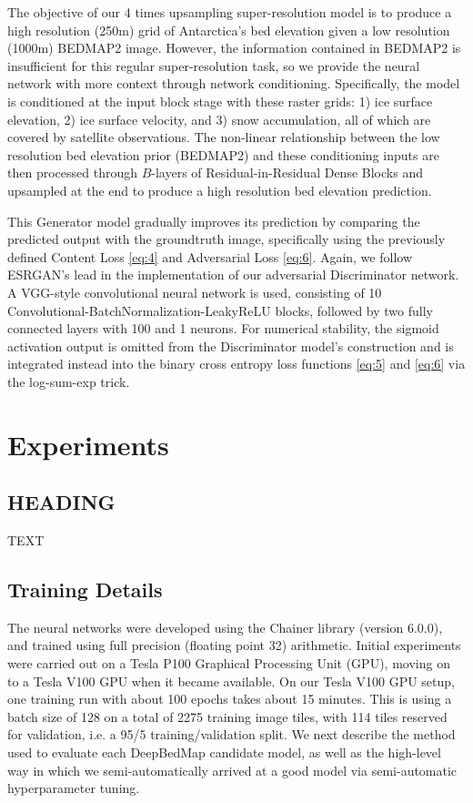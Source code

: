 \documentclass[tc, manuscript]{copernicus}
\begin{document}
The objective of our 4 times upsampling super-resolution model is to produce a high resolution (250m) grid of Antarctica's bed elevation given a low resolution (1000m) BEDMAP2 \citep{FretwellBedmap2improvedice2013} image.
However, the information contained in BEDMAP2 is insufficient for this regular super-resolution task, so we provide the neural network with more context through network conditioning.
Specifically, the model is conditioned at the input block stage with these raster grids: 1) ice surface elevation, 2) ice surface velocity, and 3) snow accumulation, all of which are covered by satellite observations.
The non-linear relationship between the low resolution bed elevation prior (BEDMAP2) and these conditioning inputs are then processed through $B$-layers of Residual-in-Residual Dense Blocks and upsampled at the end to produce a high resolution bed elevation prediction.

This Generator model gradually improves its prediction by comparing the predicted output with the groundtruth image, specifically using the previously defined Content Loss \eqref{eq:4} and Adversarial Loss \eqref{eq:6}.
Again, we follow ESRGAN's lead in the implementation of our adversarial Discriminator network.
A VGG-style convolutional neural network \citep{SimonyanVeryDeepConvolutional2014} is used, consisting of 10 Convolutional-BatchNormalization-LeakyReLU blocks, followed by two fully connected layers with 100 and 1 neurons.
For numerical stability, the sigmoid activation output is omitted from the Discriminator model's construction and is integrated instead into the binary cross entropy loss functions \eqref{eq:5} and \eqref{eq:6} via the log-sum-exp trick.

\section{Experiments}

\subsection{HEADING}
TEXT

\subsection{Training Details}

The neural networks were developed using the Chainer library (version 6.0.0), and trained using full precision (floating point 32) arithmetic.
Initial experiments were carried out on a Tesla P100 Graphical Processing Unit (GPU), moving on to a Tesla V100 GPU when it became available.
On our Tesla V100 GPU setup, one training run with about 100 epochs takes about 15 minutes.
This is using a batch size of 128 on a total of 2275 training image tiles, with 114 tiles reserved for validation, i.e. a 95/5 training/validation split.
We next describe the method used to evaluate each DeepBedMap candidate model, as well as the high-level way in which we semi-automatically arrived at a good model via semi-automatic hyperparameter tuning.
\end{document}
